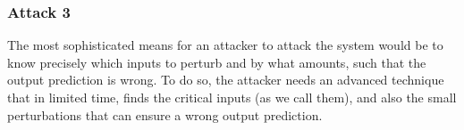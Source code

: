 \subsubsection{Attack 3}
The most sophisticated means for an attacker to attack the system would be to know precisely which inputs to perturb and by what amounts,
 such that the output prediction is wrong. 
To do so, the attacker needs an advanced technique that in limited time, finds the critical inputs (as we call them),
 and also the small perturbations that can ensure a wrong output prediction. 

















